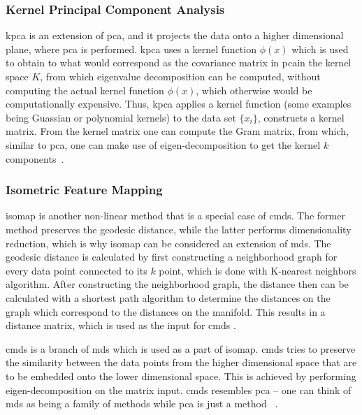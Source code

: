

\subsubsection{Kernel Principal Component Analysis}\label{subsubsec:kernel-principal-component-analysis}
\gls{kpca} is an extension of \gls{pca}, and it projects the data onto a higher dimensional plane, where \gls{pca} is performed. \gls{kpca} uses a kernel function $\phi (x)$ which is used to obtain to what would correspond as the covariance matrix in \gls{pca}in the kernel space $K$, from which eigenvalue decomposition can be computed, without computing the actual kernel function $\phi (x)$, which otherwise would be computationally expensive. Thus, \gls{kpca} applies a kernel function (some examples being Guassian or polynomial kernels) to the data set $ \{x_{i} \}$, constructs a kernel matrix. From the kernel matrix one can compute the Gram matrix, from which, similar to \gls{pca}, one can make use of eigen-decomposition to get the kernel $k$ components~\cite{kernel-pca}.


\subsubsection{Isometric Feature Mapping}\label{subsubsec:isometric-feature-mapping}
\gls{isomap} is another non-linear method that is a special case of \gls{cmds}. The former method preserves the geodesic distance, while the latter performs dimensionality reduction, which is why \gls{isomap} can be considered an extension of \gls{mds}. The geodesic distance is calculated by first constructing a neighborhood graph for every data point connected to its $k$ point, which is done with K-nearest neighbors algorithm. After constructing the neighborhood graph, the distance then can be calculated with a shortest path algorithm to determine the distances on the graph which correspond to the distances on the manifold. This results in a distance matrix, which is used as the input for \gls{cmds} \cite{Multidimensional-Scaling-Sammon-Mapping-and-Isomap}.

\gls{cmds} is a branch of \gls{mds} which is used as a part of isomap. \gls{cmds} tries to preserve the similarity between the data points from the higher dimensional space that are to be embedded onto the lower dimensional space. This is achieved by performing eigen-decomposition on the matrix input. \gls{cmds} resembles \gls{pca} -- one can think of \gls{mds} as being a family of methods while \gls{pca} is just a method~\cite{difference-between-pca-and-mds} \cite{Multidimensional-Scaling-Sammon-Mapping-and-Isomap}.

